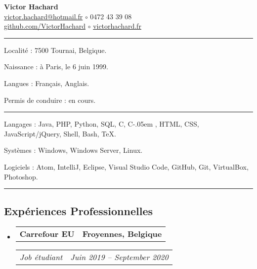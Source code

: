 \documentclass[10pt,letterpaper]{article}
\makeatletter
\newcommand{\Csharp}{%
  {\settoheight{\dimen0}{C}C\kern-.05em \resizebox{!}{\dimen0}{\raisebox{\depth}{\#}}}}
\newenvironment{indentsection}[1]
{\begin{list}{}
  {\setlength{\leftmargin}{#1}} \item[]
}
{\end{list}}
\newcommand{\headerrow}[2]
{\begin{tabular*}{\linewidth}{l@{\extracolsep{\fill}}r}
  #1 &
  #2 \\
\end{tabular*}}
\makeatother
\begin{document}
\begin{center}
  \huge \textbf{Victor Hachard} \\
  \large
  \href{mailto:victor.hachard@hotmail.fr}{victor.hachard@hotmail.fr}
  $\circ$
  0472 43 39 08
  \\
  \href{http://www.github.com/VictorHachard}{github.com/VictorHachard}
  $\circ$
  \href{http://www.victorhachard.fr}{victorhachard.fr}
  \vspace{-0.2em}
\end{center}


\hrule
\begin{indentsection}{\parindent}
\begin{description*}
  \item[Localité :] 7500 Tournai, Belgique.
  \item[Naissance :] à Paris, le 6 juin 1999.
  \item[Langues :] Français, Anglais.
  \item[Permis de conduire :] en cours.
\end{description*}
\end{indentsection}


\hrule
\begin{indentsection}{\parindent}
\begin{description*}
  \item[Langages :] Java, PHP, Python, SQL, C, \Csharp, HTML,
  CSS,  JavaScript/jQuery, Shell, Bash, TeX.
  \item[Systèmes :] Windows, Windows Server, Linux.
  \item[Logiciels :] Atom, IntelliJ, Eclipse, Visual Studio Code, GitHub, Git,
  VirtualBox, Photoshop.
\end{description*}
\end{indentsection}


\hrule
\vspace{-0.4em}
\subsection*{Expériences Professionnelles}
\begin{itemize}
  \parskip=0.1em

  \item
  \headerrow
    {\textbf{Carrefour EU}}
    {\textbf{Froyennes, Belgique}}
  \headerrow
    {\emph{Job étudiant}}
    {\emph{Juin 2019 -- September 2020}}
  \end{itemize}
\end{document}
